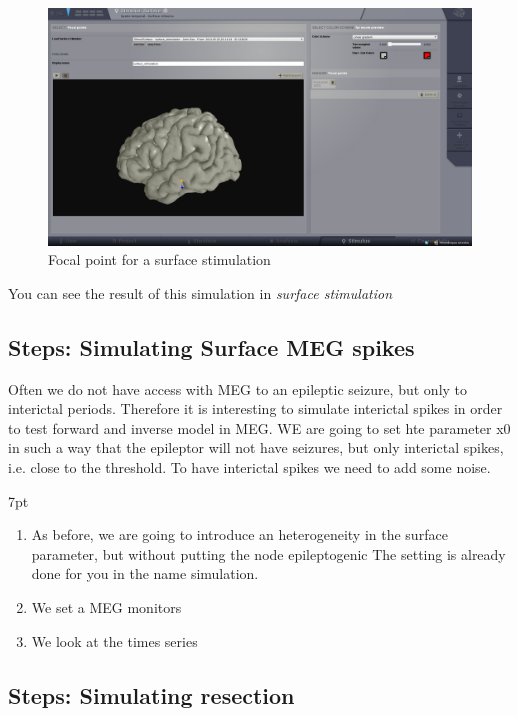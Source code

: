 \documentclass{tufte-handout}
\newenvironment{simulation}{%
  \def\FrameCommand{%
    \hspace{1pt}%
    {\color{ForestGreen}\vrule width 2pt}%
    {\color{simulationshade}\vrule width 4pt}%
    \colorbox{simulationshade}%
  }%
  \MakeFramed{\advance\hsize-\width\FrameRestore}%
  \noindent\hspace{-4.55pt}%
  \begin{adjustwidth}{}{7pt}%
  \vspace{2pt}\vspace{2pt}%
}
{%
  \vspace{2pt}\end{adjustwidth}\endMakeFramed%
}
\begin{document}
\begin{figure}[h]
  \includegraphics[width=\linewidth]{Handout_UI_ModellingAnEpilepticPatient_StimulationFocalPoint}%
  \caption{Focal point for a surface stimulation}%
  \label{fig:stim_foc}%
\end{figure}

You can see the result of this simulation in \textit{surface stimulation}


\subsection{Steps: Simulating Surface MEG spikes}

Often we do not have access with MEG to an epileptic seizure, but only to interictal periods.
Therefore it is interesting to simulate interictal spikes in order to test forward and inverse model in MEG.
WE are going to set hte parameter x0 in such a way that the epileptor will not have seizures, but only interictal spikes, 
i.e. close to the threshold. To have interictal spikes we need to add some noise.

  \begin{simulation}
  \begin{enumerate}
  \item As before, we are going to introduce an heterogeneity in the surface parameter, but without putting the node epileptogenic
  The setting is already done for you in the name simulation.
  \item We set a MEG monitors
  \item We look at the times series
\end{enumerate}
\end{simulation}

\subsection{Steps: Simulating resection}
\end{document}
